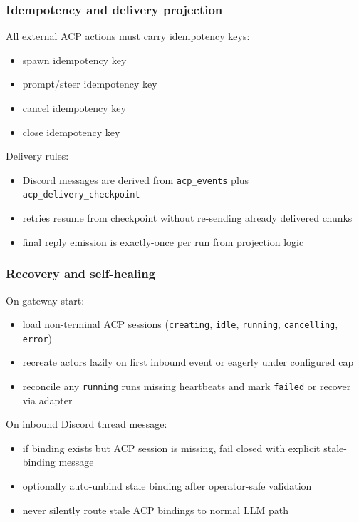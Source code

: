 \subsubsection{Idempotency and delivery projection}


All external ACP actions must carry idempotency keys:

\begin{itemize}
  \item spawn idempotency key
  \item prompt/steer idempotency key
  \item cancel idempotency key
  \item close idempotency key
\end{itemize}


Delivery rules:

\begin{itemize}
  \item Discord messages are derived from \texttt{acp\_events} plus \texttt{acp\_delivery\_checkpoint}
  \item retries resume from checkpoint without re-sending already delivered chunks
  \item final reply emission is exactly-once per run from projection logic
\end{itemize}


\subsubsection{Recovery and self-healing}


On gateway start:

\begin{itemize}
  \item load non-terminal ACP sessions (\texttt{creating}, \texttt{idle}, \texttt{running}, \texttt{cancelling}, \texttt{error})
  \item recreate actors lazily on first inbound event or eagerly under configured cap
  \item reconcile any \texttt{running} runs missing heartbeats and mark \texttt{failed} or recover via adapter
\end{itemize}


On inbound Discord thread message:

\begin{itemize}
  \item if binding exists but ACP session is missing, fail closed with explicit stale-binding message
  \item optionally auto-unbind stale binding after operator-safe validation
  \item never silently route stale ACP bindings to normal LLM path
\end{itemize}


